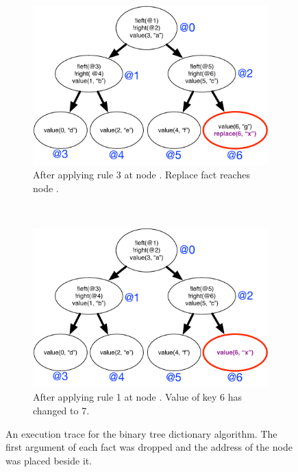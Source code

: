 \begin{figure}[h]
\begin{subfigure}[b]{0.5\textwidth}
                \label{fig:language:btree_trace2}
        \end{subfigure}\\
        \begin{subfigure}[b]{0.5\textwidth}
                \includegraphics[width=\textwidth]{figures/btree/btree_trace3}
                \caption{After applying rule 3 at node . Replace fact
                   reaches node .}
                \label{fig:language:btree_trace3}
        \end{subfigure}%
        ~
        \begin{subfigure}[b]{0.5\textwidth}
                  \includegraphics[width=\textwidth]{figures/btree/btree_trace4}
                  \caption{After applying rule 1 at node . Value of key 6 has changed to 7.}
                  \label{fig:language:btree_trace4}
          \end{subfigure}
        \caption{An execution trace for the binary tree dictionary
           algorithm. The first argument of each fact was dropped and the
           address of the node was placed beside it.}\label{fig:language:btree_trace}
\end{figure}

